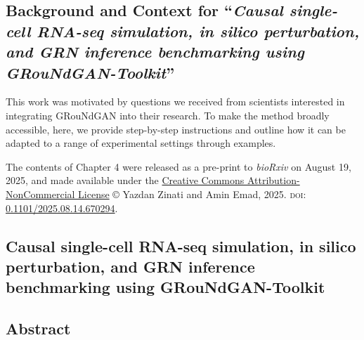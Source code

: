 \begin{singlespace}
\chapter*{Background and Context for ``\textit{Causal single-cell RNA-seq simulation, in silico perturbation, and GRN inference benchmarking using GRouNdGAN-Toolkit}''}
\end{singlespace}

This work was motivated by questions we received from scientists interested in integrating GRouNdGAN into their research. To make the method broadly accessible, here, we provide step-by-step instructions and outline how it can be adapted to a range of experimental settings through examples.

\vspace{0.5cm}

    \begin{tcolorbox}
The contents of Chapter 4 were released as a pre-print to \textit{bioRxiv} on August 19, 2025, and made available under the \href{https://creativecommons.org/licenses/by-nc/4.0/legalcode.en}{Creative
Commons Attribution-NonCommercial License} © Yazdan Zinati and Amin Emad, 2025. \textsc{doi}: \href{https://doi.org/10.1101/2025.08.14.670294}{0.1101/2025.08.14.670294}.
    \end{tcolorbox}
    

\begin{singlespace}
\chapter[Causal single-cell RNA-seq simulation, in silico perturbation, and GRN inference benchmarking using GRouNdGAN-Toolkit]{Causal single-cell RNA-seq simulation, in silico perturbation, and GRN inference benchmarking using GRouNdGAN-Toolkit}
%
\end{singlespace}

\renewcommand{\thetable}{\arabic{table}}
\renewcommand{\thefigure}{\arabic{figure}}


\section*{Abstract}

